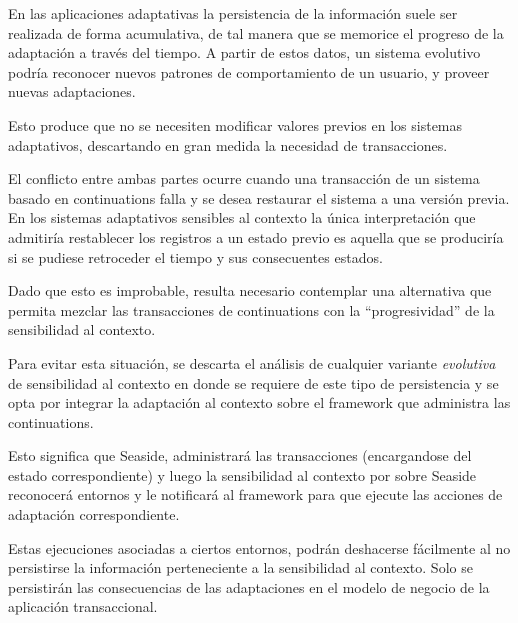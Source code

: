 En las aplicaciones adaptativas la persistencia de la información suele ser realizada de forma acumulativa, de tal manera que se memorice el progreso de la adaptación a través del tiempo. A partir de estos datos, un sistema evolutivo podría reconocer nuevos patrones de comportamiento de un usuario, y proveer nuevas adaptaciones.

Esto produce que no se necesiten modificar valores previos en los sistemas adaptativos, descartando en gran medida la necesidad de transacciones.

El conflicto entre ambas partes ocurre cuando una transacción de un sistema basado en continuations falla y se desea restaurar el sistema a una versión previa. En los sistemas adaptativos sensibles al contexto la única interpretación que admitiría restablecer los registros a un estado previo es aquella que se produciría si se pudiese retroceder el tiempo y sus consecuentes estados.

Dado que esto es improbable, resulta necesario contemplar una alternativa que permita mezclar las transacciones de continuations con la ``progresividad'' de la sensibilidad al contexto.

Para evitar esta situación, se descarta el análisis de cualquier variante \emph{evolutiva} de sensibilidad al contexto en donde se requiere de este tipo de persistencia y se opta por integrar la adaptación al contexto sobre el framework que administra las continuations.

Esto significa que Seaside, administrará las transacciones (encargandose del estado correspondiente) y luego la sensibilidad al contexto por sobre Seaside reconocerá entornos y le notificará al framework para que ejecute las acciones de adaptación correspondiente.

Estas ejecuciones asociadas a ciertos entornos, podrán deshacerse fácilmente al no persistirse la información perteneciente a la sensibilidad al contexto. Solo se persistirán las consecuencias de las adaptaciones en el modelo de negocio de la aplicación transaccional.